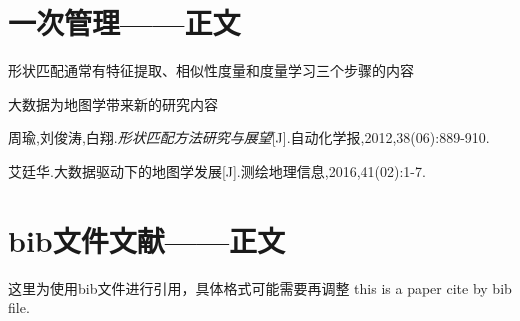 \documentclass{ctexart}
\begin{document}
	\section{一次管理——正文}
	形状匹配通常有特征提取、相似性度量和度量学习三个步骤的内容\cite{key1}
	
	大数据为地图学带来新的研究内容\cite{key2}
	\begin{thebibliography}{99}
		周瑜,刘俊涛,白翔.\emph{形状匹配方法研究与展望}[J].自动化学报,2012,38(06):889-910.
		
		艾廷华.大数据驱动下的地图学发展[J].测绘地理信息,2016,41(02):1-7.
	\end{thebibliography}

	\section{bib文件文献——正文}
	这里为使用bib文件进行引用，具体格式可能需要再调整
	this is a paper cite by bib file\cite{Ai2007}.
	
	
\end{document}
